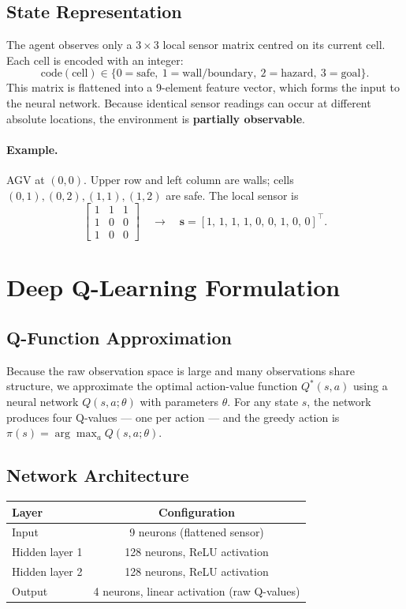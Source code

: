 \documentclass[11pt]{article}
\begin{document}
\subsection{State Representation}

The agent observes only a $3 \times 3$ local sensor matrix centred on its current cell. Each cell is encoded with an integer:
\[
\text{code}(\text{cell}) \in \{0=\text{safe},\ 1=\text{wall/boundary},\ 2=\text{hazard},\ 3=\text{goal}\}.
\]
This matrix is flattened into a 9-element feature vector, which forms the input to the neural network. Because identical sensor readings can occur at different absolute locations, the environment is \textbf{partially observable}.

\paragraph{Example.} AGV at $(0,0)$. Upper row and left column are walls; cells $(0,1),(0,2),(1,1),(1,2)$ are safe. The local sensor is
\[
\begin{bmatrix}
1 & 1 & 1 \\
1 & 0 & 0 \\
1 & 0 & 0
\end{bmatrix}
\quad \longrightarrow \quad
\mathbf{s} = [1,\,1,\,1,\,1,\,0,\,0,\,1,\,0,\,0]^\top.
\]

\section{Deep Q-Learning Formulation}

\subsection{Q-Function Approximation}

Because the raw observation space is large and many observations share structure, we approximate the optimal action-value function $Q^\ast(s,a)$ using a neural network $Q(s, a; \theta)$ with parameters $\theta$. For any state $s$, the network produces four Q-values --- one per action --- and the greedy action is $\pi(s) = \arg\max_{a} Q(s, a; \theta)$.

\subsection{Network Architecture}

\begin{center}
\begin{tabular}{@{}lc@{}}
\toprule
\textbf{Layer} & \textbf{Configuration} \\
\midrule
Input           & 9 neurons (flattened sensor) \\
Hidden layer 1  & 128 neurons, ReLU activation \\
Hidden layer 2  & 128 neurons, ReLU activation \\
Output          & 4 neurons, linear activation (raw Q-values) \\
\bottomrule
\end{tabular}
\end{center}
\end{document}
